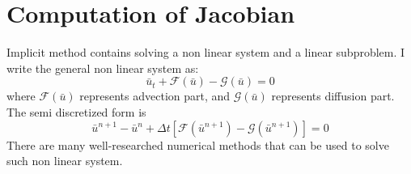 \section{Computation of Jacobian}
Implicit method contains solving a non linear system and a linear subproblem.
I write the general non linear system as:
\begin{equation} \label{eq:nonlinear}
		  \bar u_t + \mathscr{F}(\bar u) - \mathscr{G}(\bar u) = 0
\end{equation}
where $\mathscr{F}(\bar u)$ represents advection part, and $\mathscr{G} (\bar u)$ represents diffusion part.
The semi discretized form is 
\begin{equation}
		  \bar u^{n+1} - \bar u^{n} + \Delta t [\mathscr{F} (\bar u^{n+1}) - \mathscr{G}(\bar u^{n+1})] = 0
\end{equation}
There are many well-researched numerical methods that can be used to solve such non linear system.
